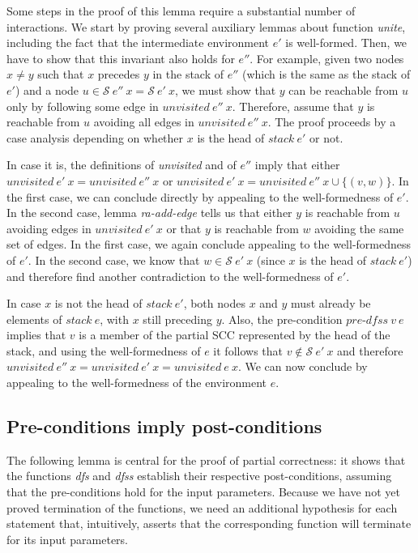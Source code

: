 \documentclass[sigplan,10pt,anonymous,review]{acmart}
\newcommand{\prog}[1]{\textit{#1}}
\renewcommand{\SS}{\mathcal{S}}
\begin{document}
Some steps in the proof of this lemma require a substantial number of interactions. We start by proving several auxiliary lemmas about function \prog{unite}, including the fact that the intermediate environment $e'$ is well-formed. Then, we have to show that this invariant also holds for $e''$. For example, given two nodes $x \neq y$ such that $x$ precedes $y$ in the stack of $e''$ (which is the same as the stack of $e'$) and a node $u \in \SS~e''~x = \SS~e'~x$, we must show that $y$ can be reachable from $u$ only by following some edge in $\prog{unvisited}~e''~x$. Therefore, assume that $y$ is reachable from $u$ avoiding all edges in $\prog{unvisited}~e''~x$. The proof proceeds by a case analysis depending on whether $x$ is the head of $\prog{stack}~e'$ or not.

In case it is, the definitions of \prog{unvisited} and of $e''$ imply that either $\prog{unvisited}~e'~x = \prog{unvisited}~e''~x$ or $\prog{unvisited}~e'~x = \prog{unvisited}~e''~x \cup \{(v,w)\}$. In the first case, we can conclude directly by appealing to the well-formedness of $e'$. In the second case, lemma \prog{ra-add-edge} tells us that either $y$ is reachable from $u$ avoiding edges in $\prog{unvisited}~e'~x$ or that $y$ is reachable from $w$ avoiding the same set of edges. In the first case, we again conclude appealing to the well-formedness of $e'$. In the second case, we know that $w \in \SS~e'~x$ (since $x$ is the head of $\prog{stack}~e'$) and therefore find another contradiction to the well-formedness of $e'$.

In case $x$ is not the head of $\prog{stack}~e'$, both nodes $x$ and $y$ must already be elements of $\prog{stack}~e$, with $x$ still preceding $y$. Also, the pre-condition $\prog{pre-dfss}~v~e$ implies that $v$ is a member of the partial SCC represented by the head of the stack, and using the well-formedness of $e$ it follows that $v \notin \SS~e'~x$ and therefore $\prog{unvisited}~e''~x = \prog{unvisited}~e'~x = \prog{unvisited}~e~x$. We can now conclude by appealing to the well-formedness of the environment $e$.


\subsection{Pre-conditions imply post-conditions}
\label{sec:pre-implies-post}

The following lemma is central for the proof of partial correctness: it shows that the functions \prog{dfs} and \prog{dfss} establish their respective post-conditions, assuming that the pre-conditions hold for the input parameters. Because we have not yet proved termination of the functions, we need an additional hypothesis for each statement that, intuitively, asserts that the corresponding function will terminate for its input parameters.
\end{document}
